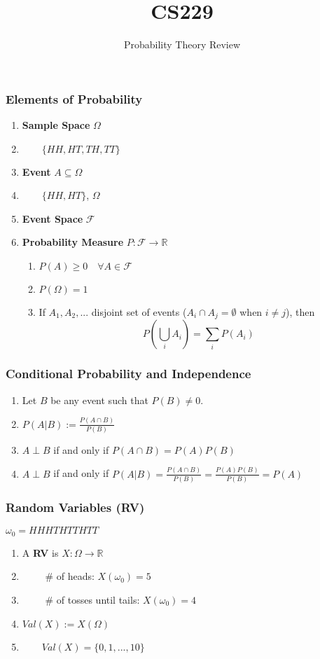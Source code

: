 \documentclass{beamer}
\title{CS229}
\author{Probability Theory Review}
\date{}
\begin{document}
\begin{frame}
\titlepage
\end{frame}
\begin{frame}
\frametitle{Elements of Probability}
\pause 
\begin{enumerate}
\itemsep1em
\item[] \textbf{Sample Space} $\Omega$
\pause 
\item[] \indent $\qquad \{HH, HT, TH, TT\}$
\pause
\item[] \textbf{Event} $A\subseteq \Omega$
\pause  
\item[] \indent $\qquad \{HH, HT\}$, \pause $\Omega$
\pause  
\item[] \textbf{Event Space} $\mathcal{F}$ 
\pause 
\item[] \textbf{Probability Measure} $P:\mathcal{F}\rightarrow\mathbb{R}$
\begin{enumerate}
\itemsep1em
\pause 
\item[] $P(A)\geq 0\quad \forall A\in\mathcal{F}$
\pause
\item[] $P(\Omega)=1$
\pause
\item[] If $A_1,A_2,...$ disjoint set of events ($A_i\cap A_j=\emptyset$ when $i\neq j$), then
$$P\left(\bigcup_i A_i\right)=\sum_iP(A_i)$$
\end{enumerate}
\end{enumerate}
\end{frame}
\begin{frame}
\frametitle{Conditional Probability and Independence}
\pause 
\begin{enumerate}
\itemsep3em
\item[] Let $B$ be any event such that $P(B)\neq 0$.
\pause 
\item[] $P(A|B):=\frac{P(A\cap B)}{P(B)}$
\pause 
\item[] $A\perp B$ if and only if $P(A\cap B)=P(A)P(B)$
\pause
\item[] $A\perp B$ if and only if $P(A|B)=\frac{P(A\cap B)}{P(B)}=\frac{P(A)P(B)}{P(B)}=P(A)$
\end{enumerate}
\end{frame}
\begin{frame}
\frametitle{Random Variables (RV)}
\pause
\begin{center}$\omega_0=HHHTHTTHTT$\end{center}
\pause 
\begin{enumerate}
\itemsep2em
\item[] A \textbf{RV} is $X:\Omega\rightarrow\mathbb{R}$
\pause
\item[] \indent $\qquad$ \# of heads: $X(\omega_0)=5$
\pause
\item[] \indent $\qquad$ \# of tosses until tails: $X(\omega_0)=4$
\pause 
\item[] $Val(X):=X(\Omega)$
\pause 
\item[] \indent $\qquad Val(X)=\{0,1,...,10\}$ 
\end{enumerate}
\end{frame}
\end{document}

